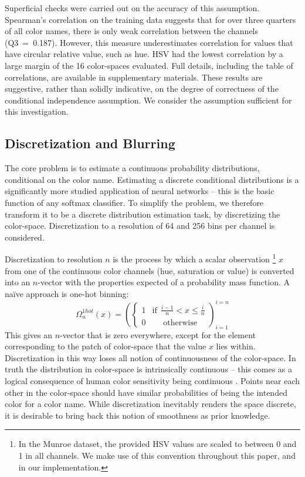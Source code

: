 \documentclass[11pt,a4paper]{article}
\newcommand{\parencite}{\citep}
\begin{document}
Superficial checks were carried out on the accuracy of this assumption.
Spearman's correlation on the training data suggests that for over three quarters of all color names, there is only weak correlation between the channels (\mbox{Q3 = 0.187}).
However, this measure underestimates correlation for values that have circular relative value, such as hue.
HSV had the lowest correlation by a large margin of the 16 color-spaces evaluated.
Full details, including the table of correlations, are available in supplementary materials.
These results are suggestive, rather than solidly indicative, on the degree of correctness of the conditional independence assumption.
We consider the assumption sufficient for this investigation.



\subsection{Discretization and Blurring}\label{sec:discretization-and-blurring}
The core problem is to estimate a continuous  probability distributions, conditional on the color name.
Estimating a discrete conditional distributions is a significantly more studied application of neural networks
-- this is the basic function of any softmax classifier.
To simplify the problem, we therefore transform it to be a discrete distribution estimation task, by discretizing the color-space.
Discretization to a resolution of 64 and 256 bins per channel is considered.


Discretization to resolution $n$ is the process by which a scalar observation%
\footnote{In the Munroe dataset, the provided HSV values are scaled to between 0 and 1 in all channels. We make use of this convention throughout this paper, and in our implementation.}
 $x$
from one of the continuous color channels (hue, saturation or value) is converted into an $n$-vector with the properties expected of a probability mass function.
A na{\"i}ve approach is one-hot binning:
\[\Omega_{n}^{1hot}(x)=\left(\begin{cases}
1 & \mathrm{if}\:\:\frac{i-1}{n}<x\le\frac{i}{n}\\
0 & \:\:\:\:\:\:\mathrm{otherwise}
\end{cases}\right)_{i=1}^{i=n}
\]
This gives an $n$-vector that is zero everywhere, except for the element corresponding to the patch of color-space that the value $x$ lies within.
Discretization in this way loses all notion of continuousness of the color-space.
%
In truth the distribution in color-space is intrinsically continuous -- this comes as a logical consequence of human color sensitivity being continuous \parencite{STOCKMAN1999perception}.
Points near each other in the color-space should have similar probabilities of being the intended color for a color name.
While discretization inevitably renders the space discrete, it is desirable to bring back this notion of smoothness as prior knowledge.
\end{document}

